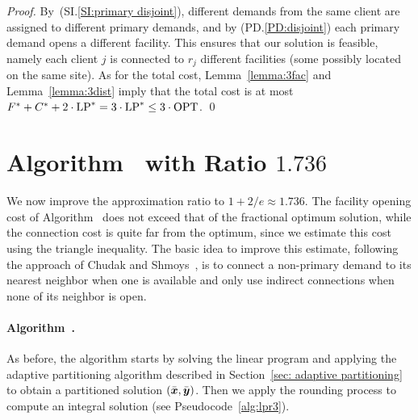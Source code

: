 \documentclass{llncs}
\begin{document}
\begin{proof}
  By~(SI.\ref{SI:primary disjoint}), different
  demands from the same client are assigned to different
  primary demands, and by (PD.\ref{PD:disjoint}) each primary
  demand opens a different facility. This ensures that our
  solution is feasible, namely each client $j$ is connected
  to $r_j$ different facilities (some possibly located on
  the same site).  As for the total cost,
  Lemma~\ref{lemma:3fac} and Lemma~\ref{lemma:3dist} imply
  that the total cost is at most
  $F^\ast+C^\ast+2\cdot\mbox{\rm LP}^\ast = 3\cdot\mbox{\rm LP}^\ast \leq
  3\cdot\mbox{\rm OPT}$.
\qed
\end{proof}



\section{Algorithm~{\ECHS} with Ratio $1.736$}\label{sec: 1.736-approximation}

We now improve the approximation ratio to $1+2/e \approx
1.736$.  The facility opening cost of
Algorithm~{\EGUP} does not exceed that of the fractional optimum
solution, while the connection cost is quite far from the optimum,
since we estimate this cost using the
triangle inequality. The basic idea to improve this estimate,
following the approach of Chudak and
Shmoys~\cite{ChudakS04}, is to connect a non-primary demand to its
nearest neighbor when one is available and only use indirect connections
when none of its neighbor is open.


\paragraph{Algorithm~{\ECHS}.}  As before, the algorithm starts by
solving the linear program and applying the adaptive partitioning
algorithm described in Section~\ref{sec: adaptive partitioning} to
obtain a partitioned solution $(\bar{\boldsymbol{x}}, \bar{\boldsymbol{y}})$. Then we apply the
rounding process to compute an integral solution (see
Pseudocode~\ref{alg:lpr3}).

\end{document}
